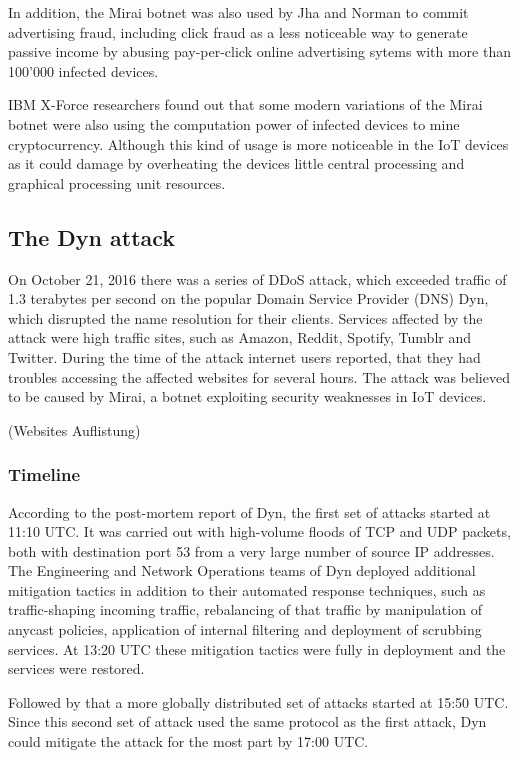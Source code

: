 In addition, the Mirai botnet was also used by Jha and Norman to commit advertising fraud, including click fraud as a less noticeable way to generate passive income by abusing pay-per-click online advertising sytems with more than 100'000 infected devices.

IBM X-Force researchers found out that some modern variations of the Mirai botnet were also using the computation power of infected devices to mine cryptocurrency. Although this kind of usage is more noticeable in the IoT devices as it could damage by overheating the devices little central processing and graphical processing unit resources.

	\subsection{The Dyn attack}
	On October 21, 2016 there was a series of DDoS attack, which exceeded traffic of 1.3 terabytes per second on the popular Domain Service Provider (DNS) Dyn, which disrupted the name resolution for their clients. Services affected by the attack were high traffic sites, such as Amazon, Reddit, Spotify, Tumblr and Twitter. During the time of the attack internet users reported, that they had troubles accessing the affected websites for several hours. The attack was believed to be caused by Mirai, a botnet exploiting security weaknesses in IoT devices.
	
	(Websites Auflistung)
	
		\subsubsection{Timeline}
		According to the post-mortem report of Dyn, the first set of attacks started at 11:10 UTC. It was carried out with high-volume floods of TCP and UDP packets, both with destination port 53 from a very large number of source IP addresses. The Engineering and Network Operations teams of Dyn deployed additional mitigation tactics in addition to their automated response techniques, such as traffic-shaping incoming traffic, rebalancing of that traffic by manipulation of anycast policies, application of internal filtering and deployment of scrubbing services. At 13:20 UTC these mitigation tactics were fully in deployment and the services were restored.
		
Followed by that a more globally distributed set of attacks started at 15:50 UTC. Since this second set of attack used the same protocol as the first attack, Dyn could mitigate the attack for the most part by 17:00 UTC.
 
